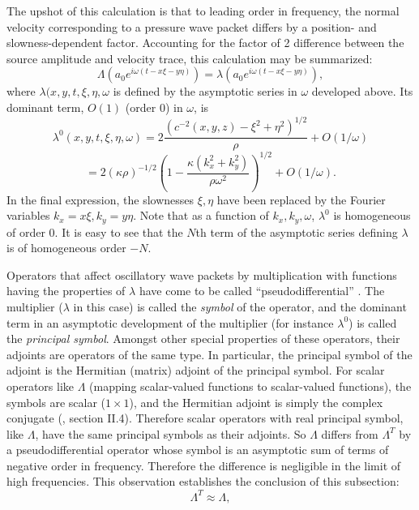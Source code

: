 \documentclass[georeport,12pt]{geophysics}
\begin{document}
The upshot of this calculation is that to leading order in frequency,
the normal velocity corresponding to a pressure wave packet differs by a position- and slowness-dependent
factor. Accounting for the factor of 2 difference between the source
amplitude and velocity trace, this calculation may be summarized:
\begin{equation}
  \label{eqn:lamwp}
  \Lambda (a_0e^{i\omega(t-x\xi-y\eta)}) = \lambda
  (a_0e^{i\omega(t-x\xi-y\eta)}),
\end{equation}
where $\lambda(x,y,t,\xi,\eta,\omega$ is
defined by the asymptotic series in $\omega$ developed above. Its dominant term,
$O(1)$ (order 0) in $\omega$, is
\[
  \lambda^0(x,y,t,\xi,\eta,\omega) = 2\frac{( c^{-2}(x,y,z)-
    \xi^2+\eta^2)^{1/2}}{\rho} + O(1/\omega)
\]
\begin{equation}
  \label{eqn:lamsymb}
= 2(\kappa
\rho)^{-1/2}\left(1-\frac{\kappa(k_x^2+k_y^2)}{\rho \omega^2}\right)^{1/2} + O(1/\omega).
\end{equation}
In the final expression, the slownesses $\xi,\eta$ have been replaced
by the Fourier variables $k_x=x\xi, k_y=y\eta$. Note that as a
function of $k_x,k_y,\omega$, $\lambda^0$ is homogeneous of order
0. It is easy to see that the $N$th term of the asymptotic series
defining $\lambda$ is of homogeneous order $-N$.

%
Operators that affect oscillatory wave packets by multiplication with
functions having the properties of $\lambda$ have come to
be called ``pseudodifferential'' \cite[]{Nir:72,Tay:81,SaiR:91}. The multiplier ($\lambda$ in this
case) is called the {\em symbol} of the operator, and the dominant
term in an asymptotic development of the multiplier
(for instance $\lambda^0$) is called the {\em principal symbol}.
Amongst other special properties of these operators, their adjoints
are operators of the same type. In particular, the principal symbol of the adjoint is
the Hermitian (matrix) adjoint of the principal symbol. For scalar
operators like $\Lambda$ (mapping scalar-valued functions to
scalar-valued functions), the symbols are scalar ($1 \times 1$), and
the Hermitian adjoint is simply the complex conjugate (\cite{Tay:81},
section II.4). Therefore scalar operators with real principal symbol,
like $\Lambda$, have the same principal symbols as their adjoints. So
$\Lambda$ differs from $\Lambda^T$ by a pseudodifferential operator
whose symbol is an asymptotic sum of terms of negative order in
frequency. Therefore the difference is negligible in the limit of high
frequencies. This observation establishes the conclusion of this subsection: 
\begin{equation}
  \label{eqn:lamappsim}
  \Lambda^T \approx \Lambda,
\end{equation}
\end{document}
